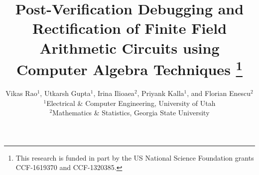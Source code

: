 \documentclass[10pt,twocolumn]{IEEEtran}
\theoremstyle{definition}
\begin{document}

\title{\Large{\sc Post-Verification Debugging and Rectification of
    Finite Field Arithmetic Circuits using Computer Algebra
    Techniques} 
  \thanks{This research is funded in part by the
   US National Science Foundation grants CCF-1619370 and
   CCF-1320385.}}

\author{Vikas Rao$^1$, Utkarsh Gupta$^1$, Irina Ilioaea$^2$, Priyank Kalla$^1$, and Florian Enescu$^2$\\
$^1$Electrical \& Computer Engineering, University of Utah\\
$^2$Mathematics \& Statistics, Georgia State University \vspace{-0.2in}
}

\maketitle

%



%


%

%



\end{document}
